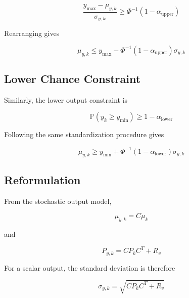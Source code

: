 \begin{equation}
    \frac{
        y_{\max}-\mu_{y,k}
    }{
        \sigma_{y,k}
    }
    \geq
    \Phi^{-1}
    \left(
        1-\alpha_{\mathrm{upper}}
    \right)
\end{equation}

Rearranging gives

\begin{equation}
    \mu_{y,k}
    \leq
    y_{\max}
    -
    \Phi^{-1}
    \left(
        1-\alpha_{\mathrm{upper}}
    \right)
    \sigma_{y,k}
    \label{eq:upper_deterministic}
\end{equation}

\subsection*{Lower Chance Constraint}

Similarly, the lower output constraint is

\begin{equation}
    \mathbb{P}
    \left(
        y_k
        \geq
        y_{\min}
    \right)
    \geq
    1-\alpha_{\mathrm{lower}}
    \label{eq:lower_chance}
\end{equation}

Following the same standardization procedure gives

\begin{equation}
    \mu_{y,k}
    \geq
    y_{\min}
    +
    \Phi^{-1}
    \left(
        1-\alpha_{\mathrm{lower}}
    \right)
    \sigma_{y,k}
    \label{eq:lower_deterministic}
\end{equation}

\subsection*{Reformulation}
From the stochastic output model,

\begin{equation}
    \mu_{y,k}
    =
    C\mu_k
\end{equation}

and

\begin{equation}
    P_{y,k}
    =
    CP_kC^T+R_v
\end{equation}

For a scalar output, the standard deviation is therefore

\begin{equation}
    \sigma_{y,k}
    =
    \sqrt{
        CP_kC^T+R_v
    }
    \label{eq:output_std}
\end{equation}


